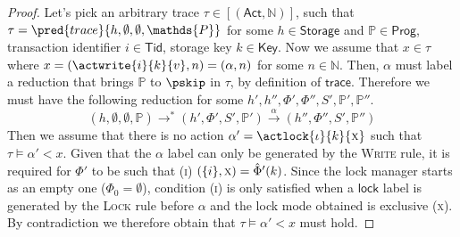\begin{proof}
Let's pick an arbitrary trace $\tau \in [(\mathsf{Act}, \mathds{N})]$, such that $\tau = \pred{trace}{h, \emptyset, \emptyset, \mathds{P}}$ for some $h \in \mathsf{Storage}$ and $\mathds{P} \in \mathsf{Prog}$, transaction identifier $i \in \mathsf{Tid}$, storage key $k \in \mathsf{Key}$. Now we assume that  $x \in \tau$ where $x = (\actwrite{i}{k}{v}, n) = (\alpha, n)$ for some $n \in \mathds{N}$. Then, $\alpha$ must label a reduction that brings $\mathds{P}$ to $\pskip$ in $\tau$, by definition of $\mathsf{trace}$. Therefore we must have the following reduction for some $h', h'', \Phi', \Phi'', S', \mathds{P}', \mathds{P}''$.
\[
(h, \emptyset, \emptyset, \mathds{P}) \rightarrow^* (h', \Phi', S', \mathds{P}') \xrightarrow{\alpha} (h'', \Phi'', S', \mathds{P}'')
\]
Then we assume that there is no action $\alpha' = \actlock{\iota}{k}{\textsc{x}}$ such that $\tau \vDash \alpha' < x$. Given that the $\alpha$ label can only be generated by the \textsc{Write} rule, it is required for $\Phi'$ to be such that (\textsc{i}) $(\{i\}, \textsc{x}) = \hat{\Phi}'(k)$. Since the lock manager starts as an empty one ($\Phi_0 = \emptyset$), condition (\textsc{i}) is only satisfied when a $\mathsf{lock}$ label is generated by the \textsc{Lock} rule before $\alpha$ and the lock mode obtained is exclusive (\textsc{x}). By contradiction we therefore obtain that $\tau \vDash \alpha' < x$ must hold.
\end{proof}


